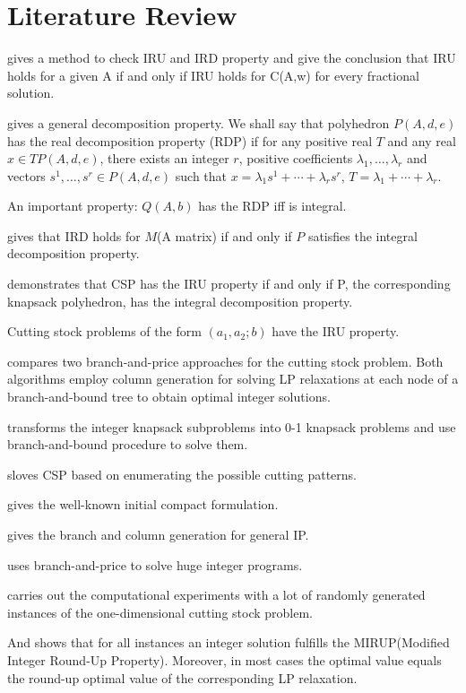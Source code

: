 \section{Literature Review}

\cite{baum1982finite} gives a method to check IRU and IRD property
and give the conclusion that IRU holds for a given A if and only if IRU holds for
C(A,w) for every fractional solution.

\cite{de1984decomposition} gives a general decomposition property.
We shall say that polyhedron $P(A, d, e)$ has the real decomposition property (RDP) if for any positive real $T$ and any real $x \in TP(A, d, e)$, there exists an integer $r$, positive coefficients $\lambda_1, \ldots, \lambda_r$ and
vectors $s^1,\ldots,s^r \in P(A,d,e)$ such that $x = \lambda_1 s^1 +\cdots + \lambda_r s^r$, $T = \lambda_1 + \cdots + \lambda_r$.

An important property: $Q(A, b)$ has the RDP iff is integral.

\cite{baum1981integer} gives that IRD holds for $M$(A matrix) if and only if $P$ satisfies the integral decomposition property.

\cite{marcotte1985cutting} demonstrates that
CSP has the IRU property if and only if P, the corresponding knapsack polyhedron,
has the integral decomposition property.

Cutting stock problems of the form $(a_1,a_2;b)$ have the IRU property.

\cite{vance1998branch} compares two branch-and-price approaches for the cutting stock problem. Both algorithms employ column generation for solving LP relaxations at each node of a branch-and-bound tree to obtain optimal integer solutions.

\cite{vanderbeck1999computational} transforms the integer knapsack subproblems into 0-1 knapsack problems and use branch-and-bound procedure to solve them.

\cite{goulimis1990optimal} sloves CSP based on enumerating the possible cutting patterns.

\cite{gilmore1961linear} gives the well-known initial compact formulation.

\cite{vanderbeck1996exact} gives the branch and column generation for general IP.

\cite{barnhart1998branch} uses branch-and-price to solve huge integer programs.

\cite{scheithauer1995modified} carries out the computational experiments with a lot of randomly generated instances of the one-dimensional cutting stock problem. 

And shows that for all instances an integer solution fulfills the MIRUP(Modified Integer Round-Up Property). Moreover, in most cases the optimal value equals the round-up optimal value of the corresponding LP relaxation.

%
%

\newpage
